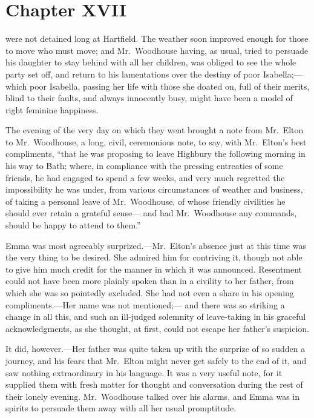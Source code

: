\chapter{Chapter XVII}


 were not detained long at Hartfield.
The weather soon improved enough for those to move who must move;
and Mr.\ Woodhouse having, as usual, tried to persuade his daughter
to stay behind with all her children, was obliged to see the whole
party set off, and return to his lamentations over the destiny
of poor Isabella;---which poor Isabella, passing her life with
those she doated on, full of their merits, blind to their faults,
and always innocently busy, might have been a model of right
feminine happiness.

The evening of the very day on which they went brought a note
from Mr.\ Elton to Mr.\ Woodhouse, a long, civil, ceremonious note,
to say, with Mr.\ Elton's best compliments, ``that he was proposing
to leave Highbury the following morning in his way to Bath;
where, in compliance with the pressing entreaties of some friends,
he had engaged to spend a few weeks, and very much regretted
the impossibility he was under, from various circumstances of
weather and business, of taking a personal leave of Mr.\ Woodhouse,
of whose friendly civilities he should ever retain a grateful sense---%
and had Mr.\ Woodhouse any commands, should be happy to attend to them.''

Emma was most agreeably surprized.---Mr.\ Elton's absence just
at this time was the very thing to be desired.  She admired
him for contriving it, though not able to give him much credit
for the manner in which it was announced.  Resentment could not
have been more plainly spoken than in a civility to her father,
from which she was so pointedly excluded.  She had not even a
share in his opening compliments.---Her name was not mentioned;---%
and there was so striking a change in all this, and such an
ill-judged solemnity of leave-taking in his graceful acknowledgments,
as she thought, at first, could not escape her father's suspicion.

It did, however.---Her father was quite taken up with the surprize
of so sudden a journey, and his fears that Mr.\ Elton might never get
safely to the end of it, and saw nothing extraordinary in his language.
It was a very useful note, for it supplied them with fresh matter
for thought and conversation during the rest of their lonely evening.
Mr.\ Woodhouse talked over his alarms, and Emma was in spirits
to persuade them away with all her usual promptitude.

